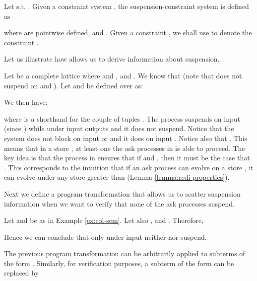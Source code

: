 \documentclass{tlp}
\begin{document}
 
\begin{definition}\label{def:sync-cs}
Let   s.t. . Given a constraint system , the suspension-constraint system  is defined as 

where  are pointwise defined,  and .
Given a constraint , we shall use 
  to denote the constraint  . 
\end{definition}

Let us illustrate  how    allows us to derive information about suspension. 

\begin{example}\label{ex:col-sem}
Let   be a complete lattice where  and , 
 and 
.  We know that 
 (note  that   does not suspend on 
 and ). Let  and  be defined over   as:

We then have:




\end{example}








where  is a shorthand for the couple of tuples  . 
The process  suspends on input  (since ) while  under input  outputs  and it does not suspend. Notice that the system   does not block on input  or  and it does on input . Notice also  that . This means that in a store , 
 at least one the ask processes in   is able to proceed. 
The key idea is that the process  in  ensures that if  and  , then it must be the case that  . This corresponds to the intuition that if an ask process can evolve on a store , it can evolve under any store greater than  (Lemma \ref{lemma:redi-properties}). 

Next we define a program transformation that allows us to scatter suspension information when we want to verify that none of the ask processes suspend. 

\begin{example} Let  and  be as in Example  \ref{ex:col-sem}. Let also  ,  and
. Therefore, 

Hence we can conclude that only under input   
 neither  nor   suspend. 
\end{example}

The previous program transformation can be arbitrarily applied to subterms of the form . Similarly, for verification purposes, a subterm of the form 
 can be replaced by 
 
\end{document}
